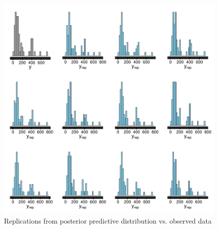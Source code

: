 \begin{figure}
\centering
	\includegraphics[scale=0.7]{sections/figs/ck_pp_y_vs_yrep_hists}
\caption{Replications from posterior predictive distribution vs. observed data}
\label{fig:ck_pp_hists}
\end{figure}


